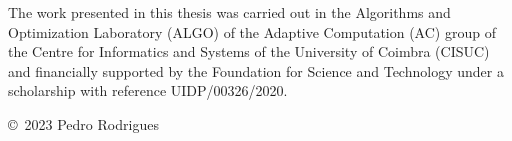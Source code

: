 \begin{funding}
  The work presented in this thesis was carried out in the Algorithms and
  Optimization Laboratory (ALGO) of the Adaptive Computation (AC) group of the
  Centre for Informatics and Systems of the University of Coimbra (CISUC) and
  financially supported by the Foundation for Science and Technology under a
  scholarship with reference UIDP/00326/2020.

  \copyright{}~2023 Pedro Rodrigues
\end{funding}